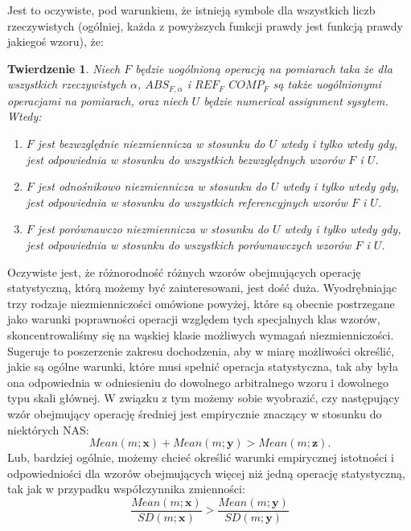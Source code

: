 \documentclass[12pt,a4paper]{report}
\newtheorem{tw}[definition]{Twierdzenie}
\begin{document}
Jest to oczywiste, pod warunkiem, że istnieją symbole dla wszystkich liczb rzeczywistych (ogólniej, każda z powyższych funkcji prawdy jest funkcją prawdy jakiegoś wzoru), że:
\begin{tw}
Niech $F$ będzie uogólnioną operacją na pomiarach taka że dla wszystkich rzeczywistych $\alpha$, $ABS_{F,\alpha}$ i $REF_{F}$ $COMP_{F}$ są także uogólnionymi operacjami na pomiarach, oraz niech $U$ będzie numerical assignment sysytem. Wtedy:
\begin{enumerate}
\item
$F$ jest bezwzględnie niezmiennicza w stosunku do $U$ wtedy i tylko wtedy gdy, jest odpowiednia w stosunku do wszystkich bezwzględnych wzorów $F$ i $U$.
\item
$F$ jest odnośnikowo niezmiennicza w stosunku do $U$ wtedy i tylko wtedy gdy, jest odpowiednia w stosunku do wszystkich referencyjnych wzorów $F$ i $U$.  
\item
$F$ jest porównawczo niezmiennicza w stosunku do $U$ wtedy i tylko wtedy gdy, jest odpowiednia w stosunku do wszystkich porównawczych wzorów $F$ i $U$.    
\end{enumerate}
\end{tw}


Oczywiste jest, że różnorodność różnych wzorów obejmujących operację statystyczną, którą możemy być zainteresowani, jest dość duża. Wyodrębniając trzy rodzaje niezmienniczości omówione powyżej, które są obecnie postrzegane jako warunki poprawności operacji względem tych specjalnych klas wzorów, skoncentrowaliśmy się na wąskiej klasie możliwych wymagań niezmienniczości. Sugeruje to poszerzenie zakresu dochodzenia, aby w miarę możliwości określić, jakie są ogólne warunki, które musi spełnić operacja statystyczna, tak aby była ona odpowiednia w odniesieniu do dowolnego arbitralnego wzoru i dowolnego typu skali głównej. W związku z tym możemy sobie wyobrazić, czy następujący wzór obejmujący operację średniej jest empirycznie znaczący w stosunku do niektórych NAS:
\begin{equation*}
Mean(m;\textbf{x})+Mean(m;\textbf{y})>Mean(m;\textbf{z}).
\end{equation*}
Lub, bardziej ogólnie, możemy chcieć określić warunki empirycznej istotności i odpowiedniości dla wzorów obejmujących więcej niż jedną operację statystyczną, tak jak w przypadku współczynnika zmienności:
\begin{equation*}
\frac{Mean(m;\textbf{x})}{SD(m;\textbf{x})} > \frac{Mean(m;\textbf{y})}{SD(m;\textbf{y})}
\end{equation*}
\end{document}
